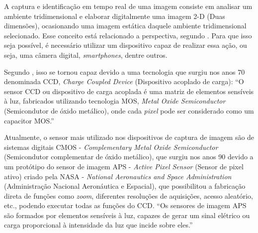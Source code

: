  


A captura e identificação em tempo real de uma imagem consiste em analisar um ambiente tridimensional e elaborar digitalmente uma imagem 2-D (Duas dimensões), ocasionando uma imagem estática daquele ambiente tridimensional selecionado. Esse conceito está relacionado a perspectiva, segundo . Para que isso seja possível, é necessário utilizar um dispositivo capaz de realizar essa ação, ou seja, uma câmera digital, \textit{smartphones}, dentre outros.

Segundo , isso se tornou capaz devido a uma tecnologia que surgiu nos anos 70 denominada CCD, \textit{Charge Coupled Device} (Dispositivo acoplado de carga): “O sensor CCD ou dispositivo de carga acoplada é uma matriz de elementos sensíveis à luz, fabricados utilizando tecnologia MOS, \textit{Metal Oxide Semiconductor} (Semicondutor de óxido metálico), onde cada \textit{pixel} pode ser considerado como um capacitor MOS.”

Atualmente, o sensor mais utilizado nos dispositivos de captura de imagem são de sistemas digitais CMOS - \textit{Complementary Metal Oxide Semiconductor} (Semicondutor complementar de óxido metálico), que surgiu nos anos 90 devido a um protótipo do sensor de imagem APS - \textit{Active Pixel Sensor} (Sensor de pixel ativo) criado pela NASA - \textit{National Aeronautics and Space Administration} (Administração Nacional Aeronáutica e Espacial), que possibilitou a fabricação direta de funções como \textit{zoom}, diferentes resoluções de aquisições, acesso aleatório, etc., podendo executar todas as funções do CCD. “Os sensores de imagem APS são formados por elementos sensíveis à luz, capazes de gerar um sinal elétrico ou carga proporcional à intensidade da luz que incide sobre eles.” \cite{CHMIELEWSKI2009}